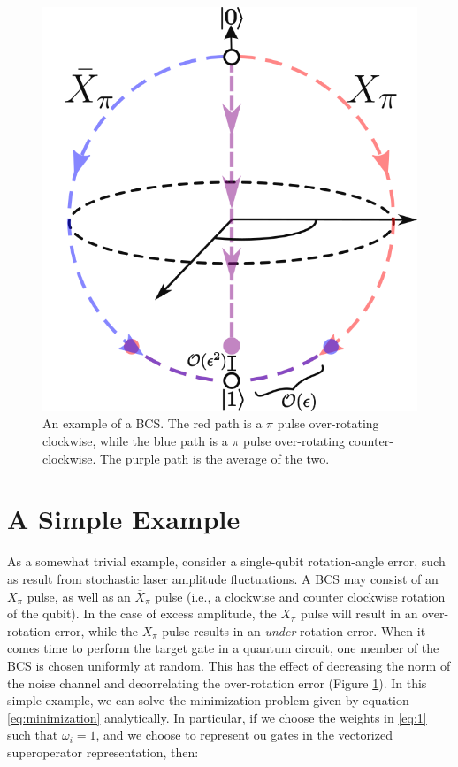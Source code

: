 \documentclass[aps,nofootinbib,pra,notitlepage,twocolumn]{revtex4-1}
\begin{document}
\begin{figure}
  \centering
  \includegraphics[width=.75\columnwidth]{simple_example.png}
  \caption{An example of a BCS. The red path is a $\pi$ pulse over-rotating clockwise, while the blue path is a $\pi$ pulse over-rotating counter-clockwise. The purple path is the average of the two.}
  \label{fig:simple_example}
\end{figure}

\section{A Simple Example}
As a somewhat trivial example, consider a single-qubit rotation-angle error, such as result from stochastic laser amplitude fluctuations. A BCS may consist of an $X_\pi$ pulse, as well as an $\bar X_\pi$ pulse (i.e., a clockwise and counter clockwise rotation of the qubit). In the case of excess amplitude, the $X_\pi$ pulse will result in an over-rotation error, while the $\bar X_\pi$ pulse results in an \emph{under}-rotation error. When it comes time to perform the target gate in a quantum circuit, one member of the BCS is chosen uniformly at random. This has the effect of decreasing the norm of the noise channel and decorrelating the over-rotation error (Figure \ref{fig:simple_example}). In this simple example, we can solve the minimization problem given by equation \ref{eq:minimization} analytically. In particular, if we choose the weights in \ref{eq:1} such that $\omega_i=1$, and we choose to represent ou gates in the vectorized superoperator representation, then:
\end{document}
